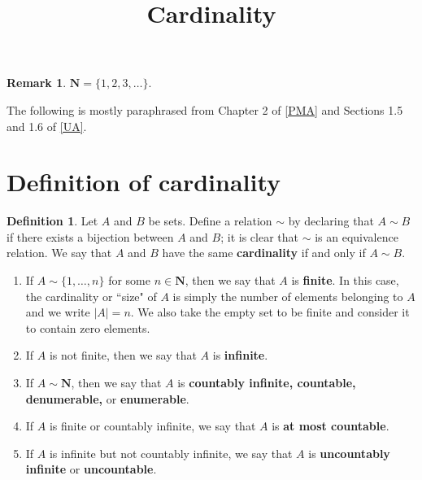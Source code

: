 \documentclass[12pt]{article}
\title{Cardinality}
\author{}
\date{\vspace{-24mm}}
\theoremstyle{definition}
\newtheorem{definition}{Definition}
\newtheorem*{remark}{Remark}
\newcommand{\N}{\mathbf{N}}
\begin{document}
\maketitle

\tableofcontents

\newpage

\begin{remark}
    \( \N = \{ 1, 2, 3, \ldots \} \).
\end{remark}

\noindent The following is mostly paraphrased from Chapter 2 of \hyperlink{pma}{[PMA]} and Sections 1.5 and 1.6 of \hyperlink{ua}{[UA]}.

\section{Definition of cardinality}
\label{sec:definition_of_cardinality}

\begin{definition}
\label{def:cardinality}
    Let \( A \) and \( B \) be sets. Define a relation \( \sim \) by declaring that \( A \sim B \) if there exists a bijection between \( A \) and \( B \); it is clear that \( \sim \) is an equivalence relation. We say that \( A \) and \( B \) have the same \textbf{cardinality} if and only if \( A \sim B \).
    \begin{enumerate}[label = (\roman*)]
        \item If \( A \sim \{ 1, \ldots, n \} \) for some \( n \in \N \), then we say that \( A \) is \textbf{finite}. In this case, the cardinality or ``size" of \( A \) is simply the number of elements belonging to \( A \) and we write \( |A| = n \). We also take the empty set to be finite and consider it to contain zero elements.

        \item If \( A \) is not finite, then we say that \( A \) is \textbf{infinite}.

        \item If \( A \sim \N \), then we say that \( A \) is \textbf{countably infinite, countable, denumerable,} or \textbf{enumerable}.

        \item If \( A \)  is finite or countably infinite, we say that \( A \) is \textbf{at most countable}.

        \item If \( A \) is infinite but not countably infinite, we say that \( A \) is \textbf{uncountably infinite} or \textbf{uncountable}.
    \end{enumerate}
\end{definition}
\end{document}
